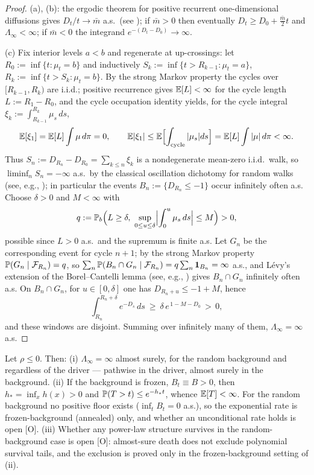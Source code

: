 \begin{proof}
(a), (b): the ergodic theorem for positive recurrent one-dimensional
diffusions gives $D_t/t\to\bar m$ a.s.\ (see \cite[Ch.~X]{RY99}); if
$\bar m>0$ then eventually $D_t\ge D_0+\tfrac{\bar m}2t$ and
$\Lambda_\infty<\infty$; if $\bar m<0$ the integrand
$e^{-(D_t-D_0)}\to\infty$.

(c) Fix interior levels $a<b$ and regenerate at up-crossings: let
$R_0:=\inf\{t:\mu_t=b\}$ and inductively
$S_k:=\inf\{t>R_{k-1}:\mu_t=a\}$, $R_k:=\inf\{t>S_k:\mu_t=b\}$. By the
strong Markov property the cycles over $[R_{k-1},R_k)$ are i.i.d.; positive
recurrence gives $\mathbb{E}[L]<\infty$ for the cycle length
$L:=R_1-R_0$, and the cycle occupation identity yields, for the cycle
integral $\xi_k:=\int_{R_{k-1}}^{R_k}\mu_s\,ds$,
\[
\mathbb{E}[\xi_1]=\mathbb{E}[L]\int\mu\,d\pi=0,\qquad
\mathbb{E}|\xi_1|\le\mathbb{E}\Bigl[\int_{\text{cycle}}|\mu_s|ds\Bigr]
=\mathbb{E}[L]\int|\mu|\,d\pi<\infty .
\]
Thus $S_n:=D_{R_n}-D_{R_0}=\sum_{k\le n}\xi_k$ is a nondegenerate mean-zero
i.i.d.\ walk, so $\liminf_nS_n=-\infty$ a.s.\ by the classical
oscillation dichotomy for random walks (see, e.g., \cite{Dur19});
in particular the events $B_n:=\{D_{R_n}\le-1\}$ occur infinitely often
a.s. Choose $\delta>0$ and $M<\infty$ with
\[
q:=\mathbb{P}_b\Bigl(L\ge\delta,\ \sup_{0\le u\le\delta}
\Bigl|\int_0^u\mu_s\,ds\Bigr|\le M\Bigr)>0,
\]
possible since $L>0$ a.s.\ and the supremum is finite a.s. Let
$G_n$ be the corresponding event for cycle $n{+}1$; by the strong Markov
property $\mathbb{P}(G_n\mid\mathcal{F}_{R_n})=q$, so
$\sum_n\mathbb{P}(B_n\cap G_n\mid\mathcal{F}_{R_n})=q\sum_n\mathbf{1}_{B_n}=\infty$ a.s., and
L\'evy's extension of the Borel--Cantelli lemma (see, e.g.,
\cite{Dur19}) gives
$B_n\cap G_n$ infinitely often a.s. On $B_n\cap G_n$, for
$u\in[0,\delta]$ one has $D_{R_n+u}\le-1+M$, hence
\[
\int_{R_n}^{R_n+\delta}e^{-D_s}\,ds\ \ge\ \delta\,e^{\,1-M-D_0}\,>\,0 ,
\]
and these windows are disjoint. Summing over infinitely many of them,
$\Lambda_\infty=\infty$ a.s.
\end{proof}

\begin{theorem}
\label{thm:trapped}
Let $\rho\le0$. Then: (i) $\Lambda_\infty=\infty$ almost surely, for
the random background and regardless of the driver --- pathwise in the
driver, almost surely in the background. (ii) If the background is
frozen, $B_t\equiv B>0$, then $h_\ast=\inf_xh(x)>0$ and
$\mathbb{P}(T>t)\le e^{-h_\ast t}$, whence $\mathbb{E}[T]<\infty$. For the random
background no positive floor exists ($\inf_tB_t=0$ a.s.), so the
exponential rate is frozen-background (annealed) only, and whether an
unconditional rate holds is open [O]. (iii) Whether any power-law structure survives in the random-background case is open [O]: almost-sure death does not exclude polynomial survival tails, and the exclusion is proved only in the frozen-background setting of (ii).
\end{theorem}

